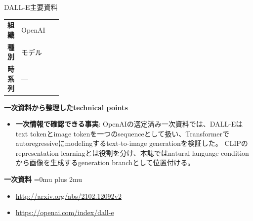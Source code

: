 \begin{technicalnote}{DALL-E}{主要資料}
\begingroup
\begin{tabularx}{\linewidth}{@{}>{\bfseries}p{0.22\linewidth}X@{}}
組織 & OpenAI \\
種別 & モデル \\
時系列 & — \\
\end{tabularx}
\smallskip
{\bfseries 一次資料から整理したtechnical points}
\begin{itemize}[leftmargin=1.5em,itemsep=0.35em]
\item \textbf{一次情報で確認できる事実}: OpenAIの選定済み一次資料では、DALL-Eはtext tokenとimage tokenを一つのsequenceとして扱い、Transformerでautoregressiveにmodelingするtext-to-image generationを検証した。 CLIPのrepresentation learningとは役割を分け、本誌ではnatural-language conditionから画像を生成するgeneration branchとして位置付ける。
\end{itemize}
\begin{minipage}{\linewidth}
\begin{samepage}
{\bfseries 一次資料}
\begingroup\sloppy
\Urlmuskip=0mu plus 2mu\relax
\begin{itemize}[leftmargin=1.5em,itemsep=0.25em]
\item {\scriptsize\url{http://arxiv.org/abs/2102.12092v2}}
\item {\scriptsize\url{https://openai.com/index/dall-e}}
\end{itemize}
\endgroup
\end{samepage}
\end{minipage}
\endgroup
\end{technicalnote}
\medskip
